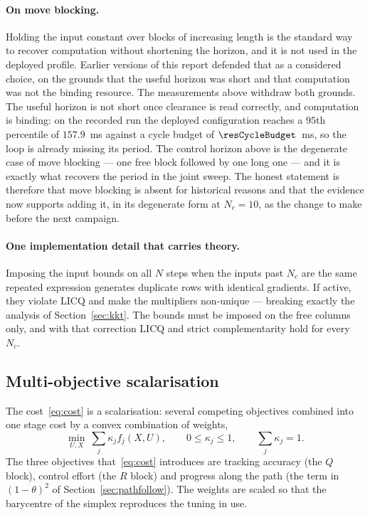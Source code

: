 \documentclass[11pt,a4paper]{article}
\newcommand{\Ninput}{N_c}
\begin{document}
\paragraph{On move blocking.} Holding the input constant over blocks of increasing length is the standard way
to recover computation without shortening the horizon, and it is not used in the deployed profile. Earlier
versions of this report defended that as a considered choice, on the grounds that the useful horizon was
short and that computation was not the binding resource. The measurements above withdraw both grounds. The
useful horizon is not short once clearance is read correctly, and computation is binding: on the recorded run
the deployed configuration reaches a $95$th percentile of $157.9$~ms against a cycle budget of
$\resCycleBudget$~ms, so the loop is already missing its period. The control horizon above is the degenerate
case of move blocking --- one free block followed by one long one --- and it is exactly what recovers the
period in the joint sweep. The honest statement is therefore that move blocking is absent for historical
reasons and that the evidence now supports adding it, in its degenerate form at $\Ninput=10$, as the change
to make before the next campaign.

\paragraph{One implementation detail that carries theory.} Imposing the input bounds on all $N$ steps when
the inputs past $\Ninput$ are the same repeated expression generates duplicate rows with identical gradients.
If active, they violate LICQ and make the multipliers non-unique --- breaking exactly the analysis of
Section~\ref{sec:kkt}. The bounds must be imposed on the free columns only, and with that correction LICQ and
strict complementarity hold for every $\Ninput$.

\subsection{Multi-objective scalarisation}
\label{sec:pareto}

The cost~\eqref{eq:cost} is a scalarisation: several competing objectives combined into one stage cost by a
convex combination of weights,
\begin{equation}
  \min_{U,X}\ \sum_{j} \kappa_j f_j(X,U),
  \qquad 0\le\kappa_j\le1,\qquad \sum_j \kappa_j = 1 .
  \label{eq:scalar}
\end{equation}
The three objectives that~\eqref{eq:cost} introduces are tracking accuracy (the $Q$ block), control effort
(the $R$ block) and progress along the path (the term in $(1-\theta)^2$ of Section~\ref{sec:pathfollow}). The
weights are scaled so that the barycentre of the simplex reproduces the tuning in use.
\end{document}
